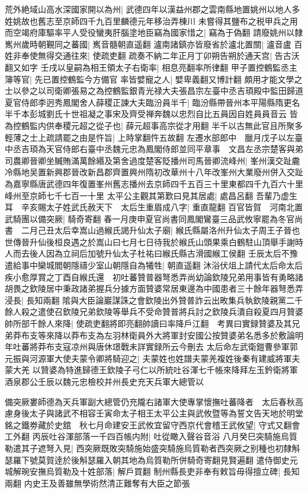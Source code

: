 荒外絶域山高水深國家開以為州|{
	武德四年以漢益州郡之雲南縣地置姚州以地人多姓姚故也舊志至京師四千九百里麟德元年移治弄棟川}
未嘗得其鹽布之税甲兵之用而空竭府庫驅率平人受役蠻夷肝腦塗地臣竊為國家惜之|{
	竊為于偽翻}
請廢姚州以隸嶲州歲時朝覲同之蕃國|{
	嶲音髓朝直遥翻}
瀘南諸鎮亦皆廢省於瀘北置關|{
	瀘音盧}
百姓非奉使無得交通往來|{
	使疏吏翻}
疏奏不納二年正月丁卯朔告朔於通天宫|{
	告古沃翻又如字}
壬戌以皇嗣為相王領太子右衛率|{
	相息亮翻率所律翻}
甲子置控鶴監丞主簿等官|{
	先已置控鶴監今方備官}
率皆嬖寵之人|{
	嬖卑義翻又博計翻}
頗用才能文學之士以參之以司衛卿張易之為控鶴監銀青光禄大夫張昌宗左臺中丞吉頊殿中監田歸道夏官侍郎李迥秀鳳閣舍人薛稷正諫大夫臨汾員半千|{
	臨汾縣帶晉州本平陽縣隋更名半千本彭城劉氏十世祖凝之事宋及齊受禅奔魏以忠烈自比五員因自姓員員音云}
皆為控鶴監内供奉稷元超之從子也|{
	薛元超事高宗從才用翻}
半千以古無此官且所聚多輕薄之士上疏請罷之由是忤旨|{
	上時掌翻忤五故翻}
左遷水部郎中　臘月戊子以左臺中丞吉頊為天官侍郎右臺中丞魏元忠為鳳閣侍郎並同平章事　文昌左丞宗楚客與弟司農卿晉卿坐贓賄滿萬餘緡及第舍過度楚客貶播州司馬晉卿流峰州|{
	峯州漢交趾麊冷縣地吴置新興郡晉改新昌郡齊置興州隋初改華州十八年改峯州大業廢州併入交趾為嘉寧縣唐武德四年復置峯州舊志播州去京師四千五百三十里東都四千九百六十里峰州至京師七千七百一十里}
太平公主觀其第歎曰見其居處|{
	處昌呂翻}
吾輩乃虚生耳　辛亥賜太子姓武氏赦天下　太后生重眉成八字|{
	重直龍翻}
百官皆賀　河南北置武騎團以備突厥|{
	騎奇寄翻}
春一月庚申夏官尚書同鳳閣鸞臺三品武攸寧罷為冬官尚書　二月己丑太后幸嵩山過緱氏謁升仙太子廟|{
	緱氏縣屬洛州升仙太子周王子晉也世傳晉升仙後桓良遇之於嵩山曰七月七日待我於緱氏山頭果乘白鶴駐山頂舉手謝時人而去後人因為立祠后加號升仙太子杜祐曰緱氏縣古滑國緱工侯翻}
壬辰太后不豫遣給事中欒城閻朝隱禱少室山朝隱自為犧牲|{
	朝直遥翻}
沐浴伏俎上請代太后命太后疾小愈厚賞之丁酉自緱氏還　初吐蕃贊普器弩悉弄尚幼論欽陵兄弟用事皆有勇略諸胡畏之欽陵居中秉政諸弟握兵分據方面贊婆常居東邊為中國患者三十餘年器弩悉弄浸長|{
	長知兩翻}
隂與大臣論巖謀誅之會欽陵出外贊普詐云出畋集兵執欽陵親黨二千餘人殺之遣使召欽陵兄弟欽陵等舉兵不受命贊普將兵討之欽陵兵潰自殺夏四月贊婆帥所部千餘人來降|{
	使疏吏翻將即亮翻帥讀曰率降戶江翻　考異曰實録贊婆及其兄弟莽布支等來降以莽布支為左羽林衛員外大將軍封安國公按贊婆弟名悉多於敷論明年吐蕃將莽布支寇凉州與唐休璟戰未詳實録所云今刪去}
太后命左武衛鎧曹參軍郭元振與河源軍大使夫蒙令卿將騎迎之|{
	夫蒙姓也姓譜夫蒙羌複姓後秦有建威將軍夫蒙大羌}
以贊婆為特進歸德王欽陵子弓仁以所統吐谷渾七千帳來降拜左玉鈐衛將軍酒泉郡公壬辰以魏元忠檢校并州長史充天兵軍大總管以

備突厥婁師德為天兵軍副大總管仍充隴右諸軍大使專掌懷撫吐蕃降者　太后春秋高慮身後太子與諸武不相容壬寅命太子相王太平公主與武攸暨等為誓文告天地於明堂銘之鐵劵藏於史舘　秋七月命建安王武攸宜留守西京代會稽王武攸望|{
	守式又翻會工外翻}
丙辰吐谷渾部落一千四百帳内附|{
	吐從瞰入聲谷音浴}
八月癸巳突騎施烏質勒遣其子遮弩入見|{
	西突厥既敗突騎施始盛突騎施烏質勒者西突厥之别種也初隸斛瑟羅下號莫賀逹於後斛瑟羅入朝其地為烏質勒所併騎奇寄翻見賢遍翻}
遣侍御史元城解琬安撫烏質勒及十姓部落|{
	解戶買翻}
制州縣長吏非奉有敕旨毋得擅立碑|{
	長知兩翻}
内史王及善雖無學術然清正難奪有大臣之節張

